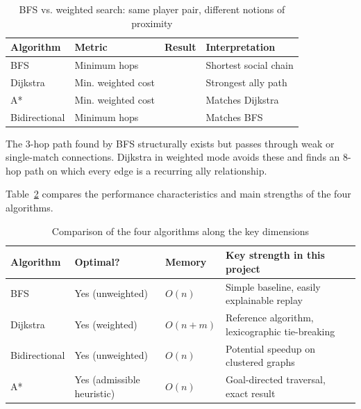 \begin{table}[H]
\centering
\caption{BFS vs. weighted search: same player pair, different notions of proximity}
\label{tab:bfs-weighted-compare}
\begin{tabularx}{\textwidth}{|>{\raggedright\arraybackslash}p{3cm}|>{\raggedright\arraybackslash}p{3cm}|>{\raggedright\arraybackslash}p{2cm}|X|}
\hline
\textbf{Algorithm} & \textbf{Metric} & \textbf{Result} & \textbf{Interpretation} \\
\hline
BFS & Minimum hops & 3 & Shortest social chain \\
Dijkstra & Min. weighted cost & 8 & Strongest ally path \\
A* & Min. weighted cost & 8 & Matches Dijkstra \\
Bidirectional & Minimum hops & 3 & Matches BFS \\
\hline
\end{tabularx}
\end{table}

The 3-hop path found by BFS structurally exists but passes through weak or single-match connections. Dijkstra in weighted mode avoids these and finds an 8-hop path on which every edge is a recurring ally relationship.

Table~\ref{tab:algo-comparison} compares the performance characteristics and main strengths of the four algorithms.

\begin{table}[H]
\centering
\caption{Comparison of the four algorithms along the key dimensions}
\label{tab:algo-comparison}
\begin{tabularx}{\textwidth}{|>{\raggedright\arraybackslash}p{3cm}|>{\raggedright\arraybackslash}p{2.5cm}|>{\raggedright\arraybackslash}X|>{\raggedright\arraybackslash}X|}
\hline
\textbf{Algorithm} & \textbf{Optimal?} & \textbf{Memory} & \textbf{Key strength in this project} \\
\hline
BFS & Yes (unweighted) & $O(n)$ & Simple baseline, easily explainable replay \\
Dijkstra & Yes (weighted) & $O(n + m)$ & Reference algorithm, lexicographic tie-breaking \\
Bidirectional & Yes (unweighted) & $O(n)$ & Potential speedup on clustered graphs \\
A* & Yes (admissible heuristic) & $O(n)$ & Goal-directed traversal, exact result \\
\hline
\end{tabularx}
\end{table}


